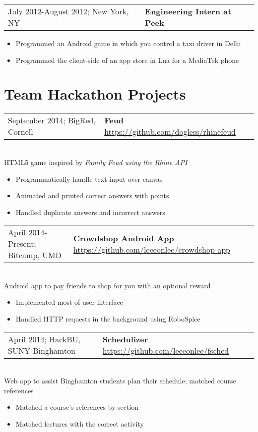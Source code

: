\documentclass[letterpaper,10pt]{article} %
\begin{document}
\begin{tabular}{@{}p{3in}l}
    July 2012-August 2012; New York, NY & \textbf{Engineering Intern at Peek}
\end{tabular}
\begin{itemize}
    \item Programmed an Android game in which you control a taxi driver in Delhi
    \item Programmed the client-side of an app store in Lua for a MediaTek phone
\end{itemize}

\section{Team Hackathon Projects}

\begin{tabular}{@{}p{3in}l}
    September 2014; BigRed, Cornell & \textbf{Feud} \footnotesize{\url{https://github.com/dogless/rhinefeud}}
\end{tabular} \\
HTML5 game inspired by \em{Family Feud} using the Rhine API
\begin{itemize}
    \item Programmatically handle text input over canvas
    \item Animated and printed correct answers with points
    \item Handled duplicate answers and incorrect answers
\end{itemize}

\begin{tabular}{@{}p{3in}l}
    April 2014-Present; Bitcamp, UMD & \textbf{Crowdshop Android App} \footnotesize{\url{https://github.com/leeeonlee/crowdshop-app}}
\end{tabular} \\
Android app to pay friends to shop for you with an optional reward
\begin{itemize}
    \item Implemented most of user interface
    \item Handled HTTP requests in the background using RoboSpice
\end{itemize}

\begin{tabular}{@{}p{3in}l}
    April 2014; HackBU, SUNY Binghamton & \textbf{Schedulizer} \footnotesize{\url{https://github.com/leeeonlee/fsched}}
\end{tabular} \\
Web app to assist Binghamton students plan their schedule; matched course references
\begin{itemize}
    \item Matched a course's references by section
    \item Matched lectures with the correct activity
\end{itemize}
\end{document}
